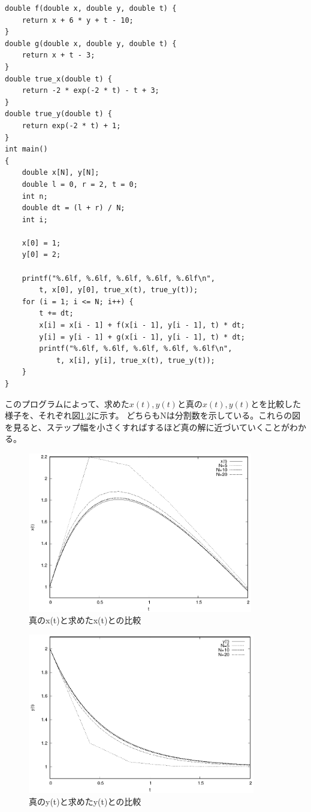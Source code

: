 \documentclass[titlepage]{jsarticle}
\begin{document}
\begin{lstlisting}[caption=作成した連立微分方程式を解くプログラム, label=src:1]
double f(double x, double y, double t) {
	return x + 6 * y + t - 10;
}
double g(double x, double y, double t) {
	return x + t - 3;
}
double true_x(double t) {
	return -2 * exp(-2 * t) - t + 3;
}
double true_y(double t) {
	return exp(-2 * t) + 1;
}
int main()
{
	double x[N], y[N];
	double l = 0, r = 2, t = 0;
	int n;
	double dt = (l + r) / N;
	int i;

	x[0] = 1;
	y[0] = 2;

	printf("%.6lf, %.6lf, %.6lf, %.6lf, %.6lf\n", 
		t, x[0], y[0], true_x(t), true_y(t));
	for (i = 1; i <= N; i++) {
		t += dt;
		x[i] = x[i - 1] + f(x[i - 1], y[i - 1], t) * dt;
		y[i] = y[i - 1] + g(x[i - 1], y[i - 1], t) * dt;
		printf("%.6lf, %.6lf, %.6lf, %.6lf, %.6lf\n", 
			t, x[i], y[i], true_x(t), true_y(t));
	}
}
\end{lstlisting}
	このプログラムによって、求めた$x(t),y(t)$と真の$x(t),y(t)$とを比較した様子を、それぞれ図\ref{fig:x(t)},\ref{fig:y(t)}に示す。
	どちらもNは分割数を示している。これらの図を見ると、ステップ幅を小さくすればするほど真の解に近づいていくことがわかる。
	\begin{figure}[H]
		 \centering
		 \includegraphics[height=7cm]{1/x(t).eps}
		 \caption{真のx(t)と求めたx(t)との比較}
		 \label{fig:x(t)}
	\end{figure}
	\begin{figure}[H]
		 \centering
		 \includegraphics[height=7cm]{1/y(t).eps}
		 \caption{真のy(t)と求めたy(t)との比較}
		 \label{fig:y(t)}
	\end{figure}
\end{document}
